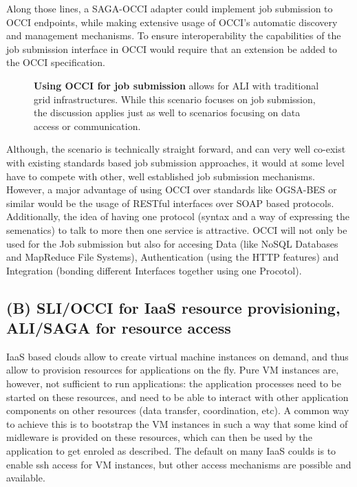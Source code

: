 \documentclass[10pt,conference,final,letterpaper,twoside,twocolumn,]{IEEEtran}
\newcommand{\B}[1]{\textbf{#1}}
\begin{document}
 Along those lines, a SAGA-OCCI adapter could implement job submission
 to OCCI endpoints, while making extensive usage of OCCI's automatic
 discovery and management mechanisms. To ensure interoperability the
 capabilities of the job submission interface in OCCI would require
 that an extension be added to the OCCI specification.
 
 \begin{figure}[h!]
  \caption{\footnotesize\label{fig:arch1} \B{Using OCCI for job 
     submission} allows for ALI with traditional grid infrastructures.  
     While this scenario focuses on job submission, the discussion 
     applies just as well to scenarios focusing on data access or 
     communication.}
 \end{figure}
 
 Although, the scenario is technically straight forward, and can very
 well co-exist with existing standards based job submission
 approaches, it would at some level have to compete with other, well
 established job submission mechanisms. However, a major advantage of
 using OCCI over standards like OGSA-BES or similar would be the usage
 of RESTful interfaces over SOAP based protocols. Additionally, the
 idea of having one protocol (syntax and a way of expressing the
 semenatics) to talk to more then one service is attractive.  OCCI
 will not only be used for the Job submission but also for accesing
 Data (like NoSQL Databases and MapReduce File Systems),
 Authentication (using the HTTP features) and Integration (bonding
 different Interfaces together using one Procotol).

 \subsection{(B) SLI/OCCI for IaaS resource provisioning, ALI/SAGA 
 for resource access}

 IaaS based clouds allow to create virtual machine instances on
 demand, and thus allow to provision resources for applications on the
 fly.  Pure VM instances are, however, not sufficient to run
 applications: the application processes need to be started on these resources,
 and need to be able to interact with other application components on
 other resources (data transfer, coordination, etc).  A common way to
 achieve this is to bootstrap the VM instances in such a way that some
 kind of midleware is provided on these resources, which can then be
 used by the application to get enroled as described.  The default on
 many IaaS coulds is to enable ssh access for VM instances, but other
 access mechanisms are possible and available.
\end{document}

